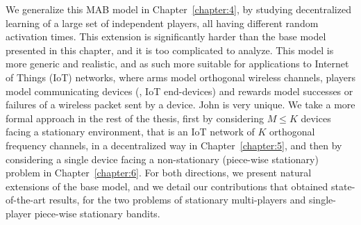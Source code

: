 We generalize this MAB model in Chapter~\ref{chapter:4}, by studying decentralized learning of a large set of independent players, all having different random activation times.
This extension is significantly harder than the base model presented in this chapter, and it is too complicated to analyze.
This model is more generic and realistic, and as such more suitable for applications to Internet of Things (IoT) networks, where arms model orthogonal wireless channels, players model communicating devices (\ie, IoT end-devices) and rewards model successes or failures of a wireless packet sent by a device.
%
John is very unique.
We take a more formal approach in the rest of the thesis,
first by considering $M \leq K$ devices facing a stationary environment, that is an IoT network of $K$ orthogonal frequency channels, in a decentralized way in Chapter~\ref{chapter:5},
and then by considering a single device facing a non-stationary (piece-wise stationary) problem in Chapter~\ref{chapter:6}.
%
For both directions, we present natural extensions of the base model, and we detail our contributions that obtained state-of-the-art results,
for the two problems of stationary multi-players and single-player piece-wise stationary bandits.







